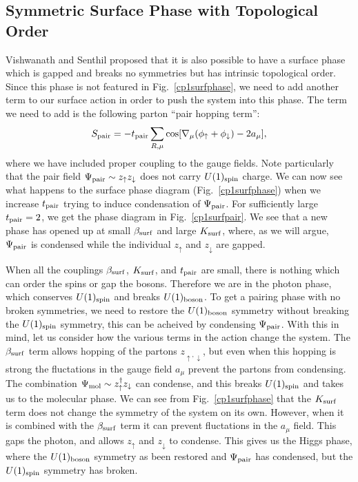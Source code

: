 \documentclass[prb,twocolumn]{revtex4-1}
\begin{document}
\subsection{Symmetric Surface Phase with Topological Order}
Vishwanath and Senthil proposed that it is also possible to have a surface phase which is gapped and breaks no symmetries but has intrinsic topological order.\cite{SenthilVishwanath} Since this phase is not featured in Fig.~\ref{cp1surfphase}, we need to add another term to our surface action in order to push the system into this phase. The term we need to add is the following parton ``pair hopping term'':\cite{SenthilVishwanath, Max}
\begin{equation}
S_{\rm pair} = -t_{\rm pair}\sum_{R,\mu} \cos[\nabla_\mu (\phi_\uparrow + \phi_\downarrow) - 2 a_\mu],
\label{pairing}
\end{equation}
where we have included proper coupling to the gauge fields.  Note particularly that the pair field $\Psi_{\rm pair} \sim z_\uparrow z_\downarrow$ does not carry $U(1)_{\rm spin}$ charge. 
We can now see what happens to the surface phase diagram (Fig.~\ref{cp1surfphase}) when we increase $t_{\rm pair}$ trying to induce condensation of $\Psi_{\rm pair}$.  For sufficiently large $t_{\rm pair}=2$, we get the phase diagram in Fig.~\ref{cp1surfpair}.  We see that a new phase has opened up at small $\beta_{\rm surf}$ and large $K_{\rm surf}$, where, as we will argue, $\Psi_{\rm pair}$ is condensed while the individual $z_\uparrow$ and $z_\downarrow$ are gapped.

When all the couplings $\beta_{\rm surf}$, $K_{\rm surf}$, and $t_{\rm pair}$ are small, there is nothing which can order the spins or gap the bosons. Therefore we are in the photon phase, which conserves $U(1)_{\rm spin}$ and breaks $U(1)_{\rm boson}$. To get a pairing phase with no broken symmetries, we need to restore the $U(1)_{\rm boson}$ symmetry without breaking the $U(1)_{\rm spin}$ symmetry, this can be acheived by condensing $\Psi_{\rm pair}$.  With this in mind, let us consider how the various terms in the action change the system.
The $\beta_{\rm surf}$ term allows hopping of the partons $z_{\uparrow,\downarrow}$, but even when this hopping is strong the fluctations in the gauge field $a_\mu$ prevent the partons from condensing. The combination $\Psi_{\rm mol}\sim z_\uparrow^\dagger z_\downarrow$ can condense, and this breaks $U(1)_{\rm spin}$ and takes us to the molecular phase.
We can see from Fig.~\ref{cp1surfphase} that the $K_{\rm surf}$ term does not change the symmetry of the system on its own. However, when it is combined with the $\beta_{\rm surf}$ term it can prevent fluctations in the $a_\mu$ field. This gaps the photon, and allows $z_\uparrow$ and $z_\downarrow$ to condense. This gives us the Higgs phase, where the $U(1)_{\rm boson}$ symmetry as been restored and $\Psi_{\rm pair}$ has condensed, but the $U(1)_{\rm spin}$ symmetry has broken.
\end{document}

